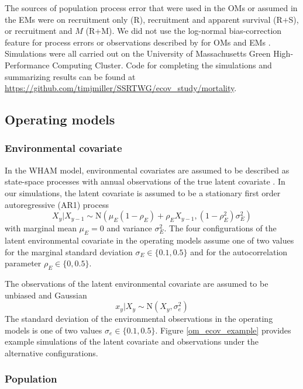 \documentclass[
  12pt,
]{article}
\begin{document}
The sources of population process error that were used in the OMs or assumed in the EMs were on recruitment only (R), recruitment and apparent survival (R+S), or recruitment and \(M\) (R+M). We did not use the log-normal bias-correction feature for process errors or observations described by \citet{stockmiller21} for OMs and EMs \citep{lietal_inreview}. Simulations were all carried out on the University of Massachusetts Green High-Performance Computing Cluster. Code for completing the simulations and summarizing results can be found at \url{https://github.com/timjmiller/SSRTWG/ecov_study/mortality}.

\hypertarget{operating-models}{%
\subsection*{Operating models}\label{operating-models}}

\hypertarget{environmental-covariate}{%
\subsubsection*{Environmental covariate}\label{environmental-covariate}}

In the WHAM model, environmental covariates are assumed to be described as state-space processes with annual observations of the true latent covariate \citep{milleretal16, stockmiller21}. In our simulations, the latent covariate is assumed to be a stationary first order autoregressive (AR1) process
\[
X_y|X_{y-1} \sim \text{N}\left(\mu_E\left(1-\rho_E\right) + \rho_E X_{y-1}, \left(1-\rho_E^2\right)\sigma^2_E\right)
\]
with marginal mean \(\mu_E=0\) and variance \(\sigma^2_E\). The four configurations of the latent environmental covariate in the operating models assume one of two values for the marginal standard deviation \(\sigma_E \in \{0.1, 0.5\}\) and for the autocorrelation parameter \(\rho_E \in \{0, 0.5\}\).

The observations of the latent environmental covariate are assumed to be unbiased and Gaussian
\[
x_y|X_y \sim \text{N}\left(X_y,\sigma^2_e\right)
\]
The standard deviation of the environmental observations in the operating models is one of two values \(\sigma_e \in \{0.1, 0.5\}\). Figure \ref{om_ecov_example} provides example simulations of the latent covariate and observations under the alternative configurations.

\hypertarget{population}{%
\subsubsection*{Population}\label{population}}
\end{document}

